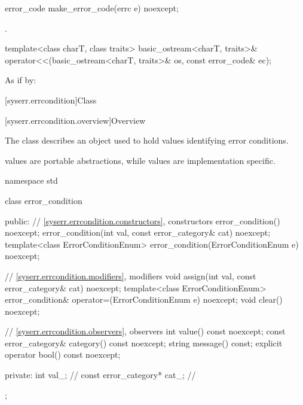 %
\begin{itemdecl}
error_code make_error_code(errc e) noexcept;
\end{itemdecl}

\begin{itemdescr}
\pnum
\returns {}.
\end{itemdescr}

%
\begin{itemdecl}
template<class charT, class traits>
  basic_ostream<charT, traits>& operator<<(basic_ostream<charT, traits>& os, const error_code& ec);
\end{itemdecl}

\begin{itemdescr}
\pnum
\effects
As if by: 

\end{itemdescr}


[syserr.errcondition]{Class }

[syserr.errcondition.overview]{Overview}

\pnum
The class  describes an object used to hold values identifying
error conditions. \begin{note}  values are portable abstractions,
while  values are implementation specific. \end{note}

%
\begin{codeblock}
namespace std {
  class error_condition {
  public:
    // \ref{syserr.errcondition.constructors}, constructors
    error_condition() noexcept;
    error_condition(int val, const error_category& cat) noexcept;
    template<class ErrorConditionEnum>
      error_condition(ErrorConditionEnum e) noexcept;

    // \ref{syserr.errcondition.modifiers}, modifiers
    void assign(int val, const error_category& cat) noexcept;
    template<class ErrorConditionEnum>
      error_condition& operator=(ErrorConditionEnum e) noexcept;
    void clear() noexcept;

    // \ref{syserr.errcondition.observers}, observers
    int value() const noexcept;
    const error_category& category() const noexcept;
    string message() const;
    explicit operator bool() const noexcept;

  private:
    int val_;                   // \expos
    const error_category* cat_; // \expos
  };
}
\end{codeblock}

